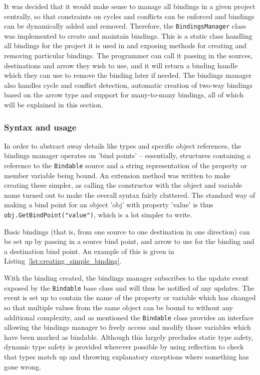 \documentclass[12pt,twoside,notitlepage]{report}
\begin{document}
It was decided that it would make sense to manage all bindings in a given project centrally, so that constraints on cycles and conflicts can be enforced and bindings can be dynamically added and removed. Therefore, the \texttt{BindingsManager} class was implemented to create and maintain bindings. This is a static class handling all bindings for the project it is used in and exposing methods for creating and removing particular bindings. The programmer can call it passing in the sources, destinations and arrow they wish to use, and it will return a binding handle which they can use to remove the binding later if needed. The bindings manager also handles cycle and conflict detection, automatic creation of two-way bindings based on the arrow type and support for many-to-many bindings, all of which will be explained in this section.

\subsubsection{Syntax and usage}

In order to abstract away details like types and specific object references, the bindings manager operates on 'bind points' -- essentially, structures containing a reference to the \texttt{Bindable} source and a string representation of the property or member variable being bound. An extension method was written to make creating these simpler, as calling the constructor with the object and variable name turned out to make the overall syntax fairly cluttered. The standard way of making a bind point for an object 'obj' with property 'value' is thus \texttt{obj.GetBindPoint("value")}, which is a lot simpler to write.

Basic bindings (that is, from one source to one destination in one direction) can be set up by passing in a source bind point, and arrow to use for the binding and a destination bind point. An example of this is given in Listing~\ref{lst:creating_simple_binding}.

With the binding created, the bindings manager subscribes to the update event exposed by the \texttt{Bindable} base class and will thus be notified of any updates. The event is set up to contain the name of the property or variable which has changed so that multiple values from the same object can be bound to without any additional complexity, and as mentioned the \texttt{Bindable} class provides an interface allowing the bindings manager to freely access and modify those variables which have been marked as bindable. Although this largely precludes static type safety, dynamic type safety is provided wherever possible by using reflection to check that types match up and throwing explanatory exceptions where something has gone wrong.
\end{document}
